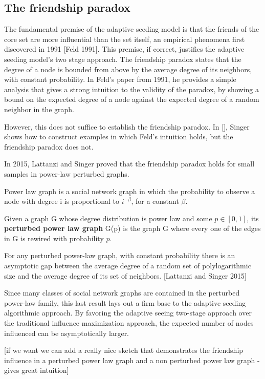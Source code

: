 \subsection{The friendship paradox}


The fundamental premise of the adaptive seeding model is that the friends
 of the core set are more influential than the set itself, an empirical
 phenomena first discovered in 1991 [Feld 1991].
 This premise, if correct, justifies the adaptive seeding model's two stage
 approach.
 The friendship paradox states that the degree of a node is bounded from
 above by the average degree of its neighbors, with constant probability.
 In Feld's paper from 1991, he provides a simple analysis that gives a strong
 intuition to the validity of the paradox, by showing a bound on the expected
 degree of a node against the expected degree of a random neighbor in the
 graph.

However, this does not suffice to establish the friendship paradox.
 In [], Singer shows how to construct examples in which Feld's intuition
 holds, but the friendship paradox does not.

In 2015, Lattanzi and Singer proved that the friendship paradox holds for
 small samples in power-law perturbed graphs.
 
\begin{definition}
Power law graph is a social network graph in which the probability to observe a node
 with degree i is proportional to $i^{-\beta}$, for a constant $\beta$.

\end{definition}

\begin{definition}

 Given a graph G whose degree distribution is power law and some $p\in [0,1]$, its \textbf{perturbed power law graph} G(p) is the graph G where every one of the edges in G is rewired with probability $p$.
\end{definition}

\begin{theorem}

 For any perturbed power-law graph, with constant probability there is an
 asymptotic gap between the average degree of a random set of polylogarithmic
 size and the average degree of its set of neighbors.
 [Lattanzi and Singer 2015]
\end{theorem}


Since many classes of social network graphs are contained in the perturbed
 power-law family, this last result lays out a firm base to the adaptive
 seeding algorithmic approach.
 By favoring the adaptive seeing two-stage approach over the traditional
 influence maximization approach, the expected number of nodes influenced
 can be asymptotically larger.



[if we want we can add a really nice sketch that demonstrates the friendship
 influence in a perturbed power law graph and a non perturbed power law
 graph - gives great intuition]



